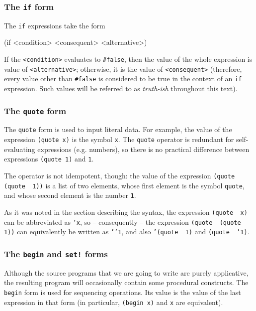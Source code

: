 \subsubsection{The \texttt{if} form}

The \texttt{if} expressions take the form
\begin{Snippet}
  (if <condition> <consequent> <alternative>)
\end{Snippet}
If the \texttt{<condition>} evaluates to \texttt{\#false},
then the value of the whole expression is value of
\texttt{<alternative>}; otherwise, it is the value of
\texttt{<consequent>} (therefore, every value other than
\texttt{\#false} is considered to be true in the context
of an \texttt{if} expression. Such values will be referred
to as \textit{truth-ish} throughout this text).

\subsubsection{The \texttt{quote} form}

The \texttt{quote} form is used to input literal data.
For example, the value of the expression \texttt{(quote x)}
is the symbol \texttt{x}. The \texttt{quote} operator is
redundant for self-evaluating expressions (e.g. numbers),
so there is no practical difference between expressions
\texttt{(quote 1)} and \texttt{1}.

The operator is not idempotent, though: the value of
the expression \texttt{(quote\,\,(quote\,\,1))} is a list
of two elements, whose first element is the symbol
\texttt{quote}, and whose second element is
the number \texttt{1}.

As it was noted in the section describing the syntax,
the expression \texttt{(quote\,\,x)} can be abbreviated
as \texttt{'x}, so -- consequently -- the expression
\texttt{(quote\,\,(quote\,\,1))} can equivalently be written
as \texttt{'\phantom{}'1}, and also \texttt{'(quote\,\,1)}
and \texttt{(quote\,\,'1)}.

\subsubsection{The \texttt{begin} and \texttt{set!} forms}

Although the source programs that we are going to write
are purely applicative, the resulting program will occasionally
contain some procedural constructs. The \texttt{begin} form
is used for sequencing operations. Its value is the value of
the last expression in that form (in particular, \texttt{(begin x)}
and \texttt{x} are equivalent).

